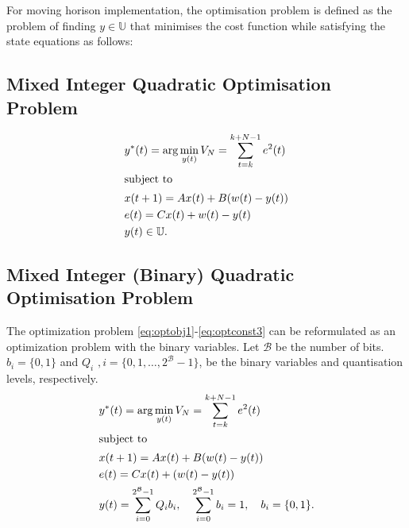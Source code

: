 \documentclass[a4paper]{article}
\begin{document}
For moving horison implementation, the optimisation problem is defined as the problem of finding $y \in \mathbb{U}$ that minimises  the cost function  while satisfying the state equations as follows:
\subsection{Mixed Integer Quadratic Optimisation Problem}
\begin{align}
		& y^{\ast}(t) = \arg  \min_{y(t) }	V_{N}  = \sum_{t=k}^{k+N-1} e^{2}(t) \label{eq:optobj1}\\
		\intertext{subject to}
		&x(t+1) = A x(t) + B (w(t)-y(t))	\label{eq:optconst1}	\\
		&e(t) = Cx(t) + w(t)-y(t)	\label{eq:optconst2}	\\
		&y(t) \in \mathbb{U}. \label{eq:optconst3}
	\end{align}
\subsection{Mixed Integer (Binary) Quadratic Optimisation Problem}
The optimization problem \eqref{eq:optobj1}-\eqref{eq:optconst3} can be reformulated as an optimization problem with the binary variables. Let $\mathcal{B}$ be the number of bits.  $b_{i} = \{0,1\}$ and $Q_{i}$ $, i = \{0, 1, \ldots, 2^{\mathcal{B}}-1\}$, be the binary variables and quantisation levels, respectively. 
\begin{align}
		& y^{\ast}(t) = \arg  \min_{y(t) }	V_{N}  = \sum_{t=k}^{k+N-1} e^{2}(t) \label{eq:optobj12}\\
		\intertext{subject to}
		&x(t+1) = A x(t) + B (w(t)-y(t))	\label{eq:optconst12}	\\
		&e(t) = Cx(t) + (w(t)-y(t))	\label{eq:optconst22}	\\
		&y(t) = \sum_{i = 0}^{2^{\mathcal{B}}-1} Q_{i}b_{i}, \quad \sum_{i = 0}^{2^{\mathcal{B}}-1}b_{i}  =1, \quad b_{i} = \{0,1\}. \label{eq:optconst32} 
	\end{align}
\end{document}
